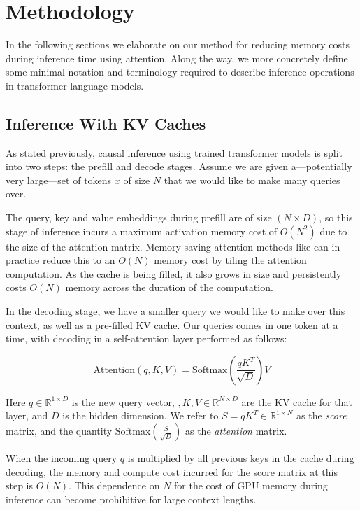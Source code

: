 \section{Methodology}
\label{methods}

In the following sections we elaborate on our method for reducing memory costs during inference time using \topk attention. Along the way, we more concretely define some minimal notation and terminology required to describe inference operations in transformer language models.

\subsection{Inference With KV Caches}

As stated previously, causal inference using trained transformer models is split into two steps: the prefill and decode stages. Assume we are given a---potentially very large---set of tokens $x$ of size $N$ that we would like to make many queries over.

The query, key and value embeddings during prefill are of size $(N\times D)$, so this stage of inference incurs a maximum activation memory cost of $O(N^2)$ due to the size of the attention matrix. Memory saving attention methods like \cite{dao2022flashattentionfastmemoryefficientexact} can in practice reduce this to an $O(N)$ memory cost by tiling the attention computation. As the cache is being filled, it also grows in size and persistently costs $O(N)$ memory across the duration of the computation.

In the decoding stage, we have a smaller query we would like to make over this context, as well as a pre-filled KV cache. Our queries comes in one token at a time, with decoding in a self-attention layer performed as follows:

\begin{equation}\label{eqn:attn}
    \text{Attention}(q,K,V) = \text{Softmax}\left(\frac{qK^{T}}{\sqrt{D}} \right)V
\end{equation}

Here $q \in \mathbb{R}^{1\times D}$ is the new query vector, $, K, V \in \mathbb{R}^{N\times D}$ are the KV cache for that layer, and $D$ is the hidden dimension. We refer to $S = qK^T \in \mathbb{R}^{1\times N}$ as the \emph{score} matrix, and the quantity $\text{Softmax}\left(\frac{S}{\sqrt{D}} \right)$ as the \emph{attention} matrix.

When the incoming query $q$ is multiplied by all previous keys in the cache during decoding, the memory and compute cost incurred for the score matrix at this step is $O(N)$. This dependence on $N$ for the cost of GPU memory during inference can become prohibitive for large context lengths.

